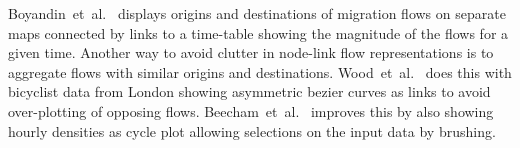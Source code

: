 \documentclass[a4paper,twocolumn]{article}
\begin{document}
Boyandin~et~al.~\cite{Boyandin2011} displays origins and
destinations of migration flows on separate maps connected
by links to a time-table showing the magnitude of the flows
for a given time.
Another way to avoid clutter in node-link
flow representations is to aggregate flows with
similar origins and destinations.
Wood~et~al.~\cite{Wood2011} does this with bicyclist data
from London showing asymmetric bezier curves as links to avoid
over-plotting of opposing flows.
Beecham~et~al.~\cite{Beecham2012} improves
this by also showing hourly densities as cycle
plot allowing selections on the input data by brushing.



\end{document}
